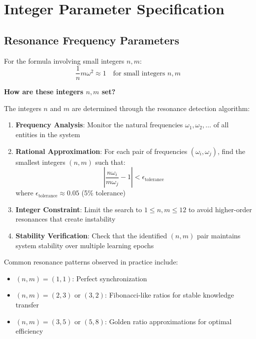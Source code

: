 \section{Integer Parameter Specification}

\subsection{Resonance Frequency Parameters}

For the formula involving small integers $n, m$:
\begin{equation}
\frac{1}{n}m\omega^2 \approx 1 \quad \text{for small integers } n,m
\end{equation}

\textbf{How are these integers $n,m$ set?}

The integers $n$ and $m$ are determined through the resonance detection algorithm:

\begin{enumerate}
    \item \textbf{Frequency Analysis}: Monitor the natural frequencies $\omega_1, \omega_2, \ldots$ of all entities in the system
    \item \textbf{Rational Approximation}: For each pair of frequencies $(\omega_i, \omega_j)$, find the smallest integers $(n,m)$ such that:
    \begin{equation}
    \left|\frac{n\omega_i}{m\omega_j} - 1\right| < \epsilon_{\text{tolerance}}
    \end{equation}
    where $\epsilon_{\text{tolerance}} \approx 0.05$ (5\% tolerance)
    \item \textbf{Integer Constraint}: Limit the search to $1 \leq n,m \leq 12$ to avoid higher-order resonances that create instability
    \item \textbf{Stability Verification}: Check that the identified $(n,m)$ pair maintains system stability over multiple learning epochs
\end{enumerate}

Common resonance patterns observed in practice include:
\begin{itemize}
    \item $(n,m) = (1,1)$: Perfect synchronization
    \item $(n,m) = (2,3)$ or $(3,2)$: Fibonacci-like ratios for stable knowledge transfer
    \item $(n,m) = (3,5)$ or $(5,8)$: Golden ratio approximations for optimal efficiency
\end{itemize}

